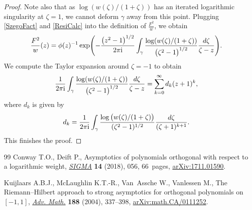 \documentclass[10pt,a4paper]{amsart}
\newcommand{\Fw}{\frac{F^2}{w}}
\newcommand{\I}{\mathrm{i}}
\numberwithin{equation}{section}
\begin{document}
\begin{proof}
Note also that as $\log(w(\zeta)/(1+\zeta))$ has an iterated logarithmic singularity at $\zeta = 1$, we cannot deform $\gamma$ away from this point. Plugging \eqref{SzegoFact} and \eqref{ResiCalc} into the definition of $\Fw$, we obtain
\begin{align*}
 \Fw(z) = \phi(z)^{-1} \exp \Biggl( - \frac{\big(z^2-1\big)^{1/2}}{2\pi\I} \int_\gamma\frac{\log(w(\zeta)/(1+\zeta))}{\big(\zeta^2-1\big)^{1/2}} \frac{{\rm d}\zeta}{\zeta-z} \Biggr).
\end{align*}
We compute the Taylor expansion around $\zeta = -1$ to obtain
\begin{align*}
 \frac{1}{2\pi\I} \int_\gamma\frac{\log(w(\zeta)/(1+\zeta))}{\big(\zeta^2-1\big)^{1/2}} \frac{{\rm d}\zeta}{\zeta-z} = \sum_{k=0}^\infty d_k (z+1)^k,
\end{align*}
where $d_k$ is given by
\begin{align*}
 d_k = \frac{1}{2\pi\I} \int_\gamma \frac{\log\big(w(\zeta)/(1+\zeta)\big)}{(\zeta^2-1)^{1/2}}\frac{{\rm d}\zeta}{(\zeta+1)^{k+1}}.
\end{align*}
This finishes the proof.
\end{proof}

\begin{thebibliography}{99}
Conway T.O., Deift P., Asymptotics of polynomials orthogonal with respect to a
 logarithmic weight, \href{https://doi.org/10.3842/SIGMA.2018.056}{\textit{SIGMA}} \textbf{14} (2018), 056, 66~pages,
 \href{https://arxiv.org/abs/1711.01590}{arXiv:1711.01590}.


Kuijlaars A.B.J., McLaughlin K.T.-R., Van~Assche W., Vanlessen M., The
 {R}iemann--{H}ilbert approach to strong asymptotics for orthogonal
 polynomials on {$[-1,1]$}, \href{https://doi.org/10.1016/j.aim.2003.08.015}{\textit{Adv. Math.}} \textbf{188} (2004), 337--398,
 \href{https://arxiv.org/abs/math.CA/0111252}{arXiv:math.CA/0111252}.
\end{thebibliography}
\end{document}
